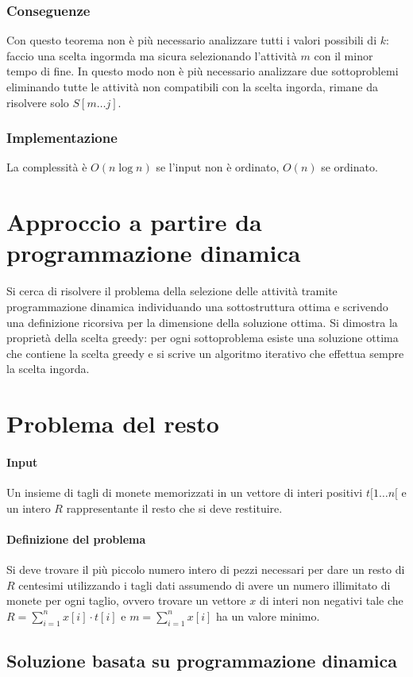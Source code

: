 \subsubsection{Conseguenze}
Con questo teorema non \`e pi\`u necessario analizzare tutti i valori possibili di $k$: faccio una scelta ingormda ma sicura selezionando l'attivit\`a $m$ con il minor tempo di fine.
In questo modo non \`e pi\`u necessario analizzare due sottoproblemi eliminando tutte le attivit\`a non compatibili con la scelta ingorda, rimane da risolvere solo $S[m\dots j]$. 
\subsubsection{Implementazione}

La complessit\`a \`e $O(n\log n)$ se l'input non \`e ordinato, $O(n)$ se ordinato. 
\section{Approccio a partire da programmazione dinamica}
Si cerca di risolvere il problema della selezione delle attivit\`a tramite programmazione dinamica individuando una sottostruttura ottima e scrivendo una definizione ricorsiva per la
dimensione della soluzione ottima. Si dimostra la propriet\`a della scelta greedy: per ogni sottoproblema esiste una soluzione ottima che contiene la scelta greedy e si scrive un
algoritmo iterativo che effettua sempre la scelta ingorda.
\section{Problema del resto}
\paragraph{Input}
Un insieme di tagli di monete memorizzati in un vettore di interi positivi $t[1\dots n[$ e un intero $R$ rappresentante il resto che si deve restituire.
\paragraph{Definizione del problema}
Si deve trovare il pi\`u piccolo numero intero di pezzi necessari per dare un resto di $R$ centesimi utilizzando i tagli dati assumendo di avere un numero illimitato di monete per ogni 
taglio, ovvero trovare un vettore $x$ di interi non negativi tale che $R=\sum\limits_{i = 1}^nx[i]\cdot t[i]$ e $m=\sum\limits_{i = 1}^nx[i]$ ha un valore minimo.
\subsection{Soluzione basata su programmazione dinamica}
